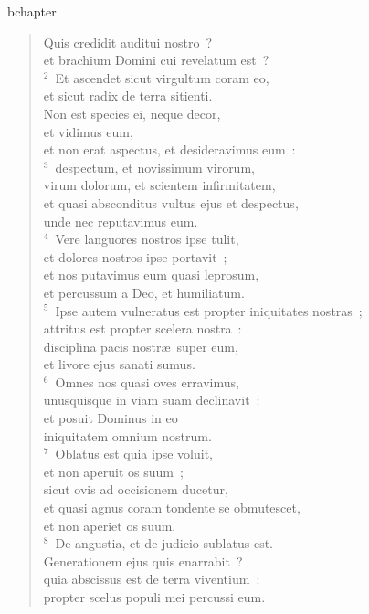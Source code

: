 bchapter\begin{verse}\vspace{-19pt}Quis credidit auditui nostro~?\\ et brachium Domini cui revelatum est~?\\
${}^{2}$~Et ascendet sicut virgultum coram eo,\\ et sicut radix de terra sitienti.\\ Non est species ei, neque decor,\\ et vidimus eum,\\ et non erat aspectus, et desideravimus eum~:\\
${}^{3}$~despectum, et novissimum virorum,\\ virum dolorum, et scientem infirmitatem,\\ et quasi absconditus vultus ejus et despectus,\\ unde nec reputavimus eum.\\
${}^{4}$~Vere languores nostros ipse tulit,\\ et dolores nostros ipse portavit~;\\ et nos putavimus eum quasi leprosum,\\ et percussum a Deo, et humiliatum.\\
${}^{5}$~Ipse autem vulneratus est propter iniquitates nostras~;\\ attritus est propter scelera nostra~:\\ disciplina pacis nostr\ae\ super eum,\\ et livore ejus sanati sumus.\\
${}^{6}$~Omnes nos quasi oves erravimus,\\ unusquisque in viam suam declinavit~:\\ et posuit Dominus in eo\\ iniquitatem omnium nostrum.\\
${}^{7}$~Oblatus est quia ipse voluit,\\ et non aperuit os suum~;\\ sicut ovis ad occisionem ducetur,\\ et quasi agnus coram tondente se obmutescet,\\ et non aperiet os suum.\\
${}^{8}$~De angustia, et de judicio sublatus est.\\ Generationem ejus quis enarrabit~?\\ quia abscissus est de terra viventium~:\\ propter scelus populi mei percussi eum.\\

\end{verse}
